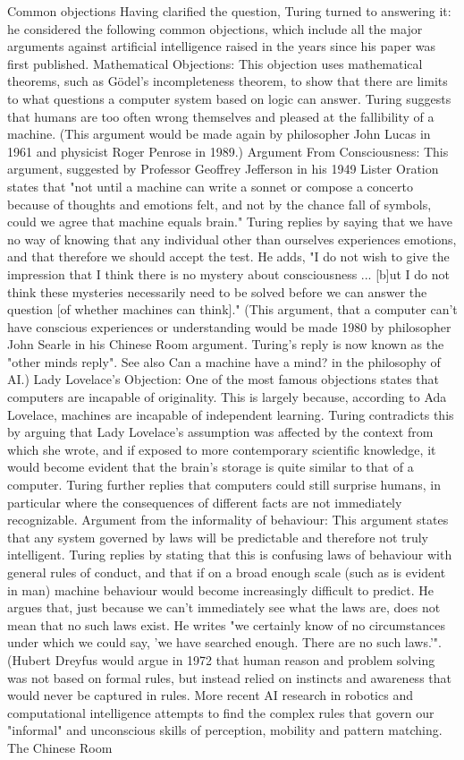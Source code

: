 Common objections
Having clarified the question, Turing turned to answering it: he considered the following common objections, which include all the major arguments against artificial intelligence raised in the years since his paper was first published.
 Mathematical Objections: This objection uses mathematical theorems, such as Gödel's incompleteness theorem, to show that there are limits to what questions a computer system based on logic can answer. Turing suggests that humans are too often wrong themselves and pleased at the fallibility of a machine. (This argument would be made again by philosopher John Lucas in 1961 and physicist Roger Penrose in 1989.) 
Argument From Consciousness: This argument, suggested by Professor Geoffrey Jefferson in his 1949 Lister Oration states that "not until a machine can write a sonnet or compose a concerto because of thoughts and emotions felt, and not by the chance fall of symbols, could we agree that machine equals brain." Turing replies by saying that we have no way of knowing that any individual other than ourselves experiences emotions, and that therefore we should accept the test. 
He adds, "I do not wish to give the impression that I think there is no mystery about consciousness ... [b]ut I do not think these mysteries necessarily need to be solved before we can answer the question [of whether machines can think]." 
(This argument, that a computer can't have conscious experiences or understanding would be made 1980 by philosopher John Searle in his Chinese Room argument. Turing's reply is now known as the "other minds reply". See also Can a machine have a mind? in the philosophy of AI.) 
Lady Lovelace's Objection: One of the most famous objections states that computers are incapable of originality. This is largely because, according to Ada Lovelace, machines are incapable of independent learning. Turing contradicts this by arguing that Lady Lovelace's assumption was affected by the context from which she wrote, and if exposed to more contemporary scientific knowledge, it would become evident that the brain's storage is quite similar to that of a computer. 
Turing further replies that computers could still surprise humans, in particular where the consequences of different facts are not immediately recognizable. 
Argument from the informality of behaviour: This argument states that any system governed by laws will be predictable and therefore not truly intelligent. Turing replies by stating that this is confusing laws of behaviour with general rules of conduct, and that if on a broad enough scale (such as is evident in man) machine behaviour would become increasingly difficult to predict. He argues that, just because we can't immediately see what the laws are, does not mean that no such laws exist. He writes "we certainly know of no circumstances under which we could say, 'we have searched enough. There are no such laws.'". (Hubert Dreyfus would argue in 1972 that human reason and problem solving was not based on formal rules, but instead relied on instincts and awareness that would never be captured in rules. More recent AI research in robotics and computational intelligence attempts to find the complex rules that govern our "informal" and unconscious skills of perception, mobility and pattern matching. 

The Chinese Room 

